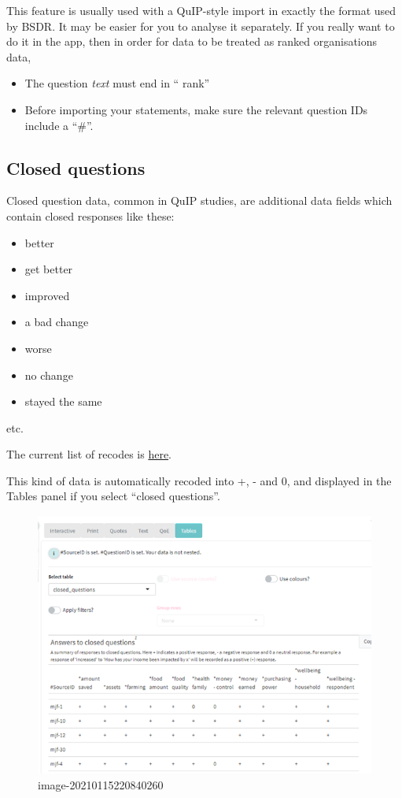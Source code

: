 \documentclass[
]{book}
\providecommand{\tightlist}{%
  \setlength{\itemsep}{0pt}\setlength{\parskip}{0pt}}
\begin{document}
This feature is usually used with a QuIP-style import in exactly the format used by BSDR. It may be easier for you to analyse it separately. If you really want to do it in the app, then in order for data to be treated as ranked organisations data,

\begin{itemize}
\tightlist
\item
  The question \emph{text} must end in `` rank''
\item
  Before importing your statements, make sure the relevant question IDs include a ``\#''.
\end{itemize}

\hypertarget{closed-questions}{%
\subsection{Closed questions}\label{closed-questions}}

Closed question data, common in QuIP studies, are additional data fields which contain closed responses like these:

\begin{itemize}
\item
  better
\item
  get better
\item
  improved
\item
  a bad change
\item
  worse
\item
  no change
\item
  stayed the same
\end{itemize}

etc.

The current list of recodes is \href{https://www.dropbox.com/s/j8mn0i7w2ahtw56/quip-recodes.csv?dl=0}{here}.

This kind of data is automatically recoded into +, - and 0, and displayed in the Tables panel if you select ``closed questions''.

\begin{figure}
\centering
\includegraphics{_assets/image-20210115220840260.png}
\caption{image-20210115220840260}
\end{figure}
\end{document}
